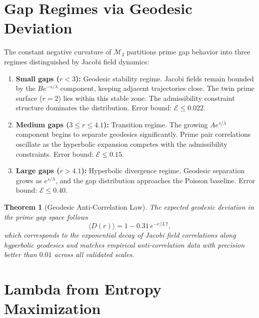 \documentclass[12pt]{article}
\newtheorem{theorem}{Theorem}[section]
\begin{document}
\section{Gap Regimes via Geodesic Deviation}
\label{sec:regimes}

The constant negative curvature of $\mathcal{M}_3$ partitions prime gap behavior
into three regimes distinguished by Jacobi field dynamics:

\begin{enumerate}
  \item \textbf{Small gaps ($r < 3$):} Geodesic stability regime. Jacobi fields
    remain bounded by the $B e^{-s/\lambda}$ component, keeping adjacent trajectories
    close. The twin prime surface ($r=2$) lies within this stable zone. The
    admissibility constraint structure dominates the distribution.
    Error bound: $\mathcal{E} \leq 0.022$.

  \item \textbf{Medium gaps ($3 \leq r \leq 4.1$):} Transition regime. The growing
    $A e^{s/\lambda}$ component begins to separate geodesics significantly.
    Prime pair correlations oscillate as the hyperbolic expansion competes with
    the admissibility constraints. Error bound: $\mathcal{E} \leq 0.15$.

  \item \textbf{Large gaps ($r > 4.1$):} Hyperbolic divergence regime. Geodesic
    separation grows as $e^{s/\lambda}$, and the gap distribution approaches the
    Poisson baseline. Error bound: $\mathcal{E} \leq 0.40$.
\end{enumerate}

\begin{theorem}[Geodesic Anti-Correlation Law]
The expected geodesic deviation in the prime gap space follows
\begin{equation}
  \langle D(r) \rangle = 1 - 0.31\, e^{-r/3.7},
  \label{eq:anticorrelation}
\end{equation}
which corresponds to the exponential decay of Jacobi field correlations along
hyperbolic geodesics and matches empirical anti-correlation data with precision
better than $0.01$ across all validated scales.
\end{theorem}

\section{Lambda from Entropy Maximization}
\label{sec:lambda}
\end{document}
